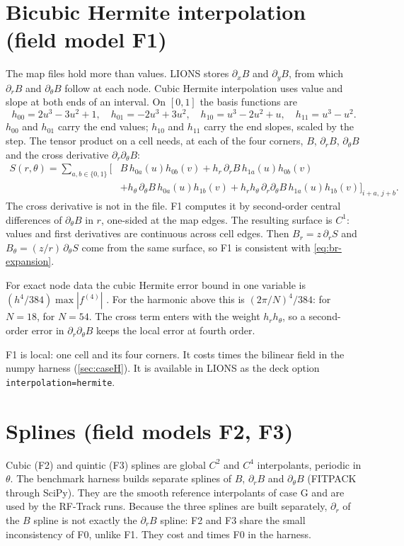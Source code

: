 \section{Bicubic Hermite interpolation (field model F1)}
The map files hold more than values.
LIONS stores $\partial_x B$ and $\partial_y B$, from which $\partial_r B$ and $\partial_\theta B$ follow at each node.
Cubic Hermite interpolation uses value and slope at both ends of an interval.
On $[0,1]$ the basis functions are
\begin{equation}
h_{00} = 2u^3-3u^2+1,\quad h_{01} = -2u^3+3u^2,\quad h_{10} = u^3-2u^2+u,\quad h_{11} = u^3-u^2 .
\end{equation}
$h_{00}$ and $h_{01}$ carry the end values; $h_{10}$ and $h_{11}$ carry the end slopes, scaled by the step.
The tensor product on a cell needs, at each of the four corners, $B$, $\partial_rB$, $\partial_\theta B$ and the cross
derivative $\partial_r\partial_\theta B$:
\begin{equation}
\begin{split}
S(r,\theta) = \sum_{a,b\in\{0,1\}}\Big[&B\,h_{0a}(u)h_{0b}(v) + h_r\,\partial_rB\,h_{1a}(u)h_{0b}(v)\\
&+ h_\theta\,\partial_\theta B\,h_{0a}(u)h_{1b}(v) + h_rh_\theta\,\partial_r\partial_\theta B\,h_{1a}(u)h_{1b}(v)\Big]_{i+a,\,j+b}.
\end{split}
\end{equation}
The cross derivative is not in the file.
F1 computes it by second-order central differences of $\partial_\theta B$ in $r$, one-sided at the map edges.
The resulting surface is $C^1$: values and first derivatives are continuous across cell edges.
Then $B_r = z\,\partial_rS$ and $B_\theta = (z/r)\,\partial_\theta S$ come from the same surface, so F1 is consistent with
\cref{eq:br-expansion}.

For exact node data the cubic Hermite error bound in one variable is $(h^4/384)\max|f^{(4)}|$ \cite{deboor1978}.
For the harmonic above this is $(2\pi/N)^4/384$: \HermErrEighteen{} for $N=18$, \HermErrFiftyFour{} for $N=54$.
The cross term enters with the weight $h_rh_\theta$, so a second-order error in $\partial_r\partial_\theta B$ keeps the
local error at fourth order.

F1 is local: one cell and its four corners.
It costs \HCostHerm{} times the bilinear field in the numpy harness (\cref{sec:caseH}).
It is available in LIONS as the deck option \texttt{interpolation=hermite}.

\section{Splines (field models F2, F3)}
Cubic (F2) and quintic (F3) splines are global $C^2$ and $C^4$ interpolants, periodic in $\theta$.
The benchmark harness builds separate splines of $B$, $\partial_rB$ and $\partial_\theta B$ (FITPACK through SciPy).
They are the smooth reference interpolants of case G and are used by the RF-Track runs.
Because the three splines are built separately, $\partial_r$ of the $B$ spline is not exactly the $\partial_rB$ spline:
F2 and F3 share the small inconsistency of F0, unlike F1.
They cost \HCostCub{} and \HCostQuin{} times F0 in the harness.

